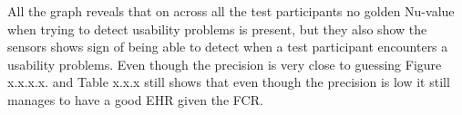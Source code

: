 All the graph reveals that on across all the test participants no golden Nu-value when trying to detect usability problems is present, but they also show the sensors shows sign of being able to detect when a test participant encounters a usability problems. Even though the precision is very close to guessing  
Figure x.x.x.x. and Table x.x.x still shows that even though the precision is low it still manages to have a good EHR given the FCR.
